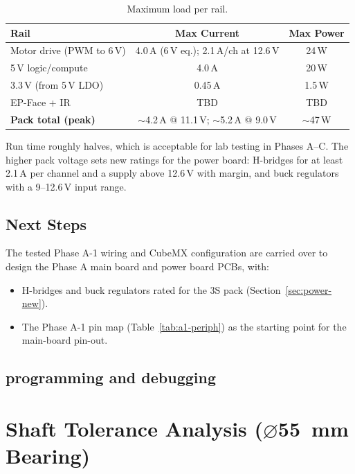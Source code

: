 \documentclass[12pt,a4paper]{article}
\begin{document}
\begin{table}[H]
\centering\small
\caption{Maximum load per rail.}
\label{tab:rail-max}
\begin{tabular}{@{}lcc@{}}
\toprule
\textbf{Rail} & \textbf{Max Current} & \textbf{Max Power} \\
\midrule
Motor drive (PWM to 6\,V) & 4.0\,A (6\,V eq.); 2.1\,A/ch at 12.6\,V & 24\,W \\
5\,V logic/compute & 4.0\,A & 20\,W \\
3.3\,V (from 5\,V LDO) & 0.45\,A & 1.5\,W \\
EP-Face + IR & TBD & TBD \\
\midrule
\textbf{Pack total (peak)} & $\sim$4.2\,A @ 11.1\,V; $\sim$5.2\,A @ 9.0\,V & $\sim$47\,W \\
\bottomrule
\end{tabular}
\end{table}

Run time roughly halves, which is acceptable for lab testing in Phases A--C.
The higher pack voltage sets new ratings for the power board: H-bridges for at
least 2.1\,A per channel and a supply above 12.6\,V with margin, and buck
regulators with a 9--12.6\,V input range.

\subsection{Next Steps}
\label{sec:elec-next}

The tested Phase A-1 wiring and CubeMX configuration are carried over to
design the Phase A main board and power board PCBs, with:
\begin{itemize}
  \item H-bridges and buck regulators rated for the 3S pack
        (Section~\ref{sec:power-new}).
  \item The Phase A-1 pin map (Table~\ref{tab:a1-periph}) as the starting
        point for the main-board pin-out.
\end{itemize}

\subsection{programming and debugging}


\clearpage
\section{Shaft Tolerance Analysis ($\varnothing$\SI{55}{mm} Bearing)}
\label{sec:shaft-tolerance}
\end{document}
